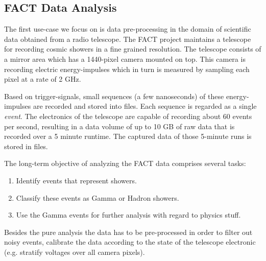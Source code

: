 \subsection{FACT Data Analysis}
The first use-case we focus on is data pre-processing in the
domain of scientific data obtained from a radio telescope. The
FACT project maintains a telescope for recording cosmic showers
in a fine grained resolution. The telescope consists of a mirror
area which has a 1440-pixel camera mounted on top. This camera
is recording electric energy-impulses which in turn is measured
by sampling each pixel at a rate of 2 GHz.

Based on trigger-signals, small sequences (a few
nanoseconds) of these energy-impulses are recorded and stored into 
files. Each sequence is regarded as a single {\em event}. 
The electronics of the telescope are capable of recording about
60 events per second, resulting in a data volume of up to 10 GB
of raw data that is recorded over a 5 minute runtime. The captured
data of those 5-minute runs is stored in files.


The long-term objective of analyzing the FACT data comprises several tasks:
\begin{enumerate}
  \item Identify events that represent showers.
  \item Classify these events as Gamma or Hadron showers.
  \item Use the Gamma events for further analysis with regard to physics stuff.
\end{enumerate}

Besides the pure analysis the data has to be pre-processed in order
to filter out noisy events, calibrate the data according to the state
of the telescope electronic (e.g. stratify voltages over all camera pixels).



